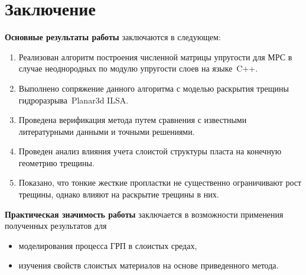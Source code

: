 \chapter*{Заключение}                       %
\label{sec:conclusion} 

\textbf{Основные результаты работы} заключаются в следующем:
\begin{enumerate}
    \item Реализован алгоритм построения численной матрицы упругости для МРС в случае неоднородных по модулю упругости слоев на языке~C++.
    \item Выполнено сопряжение данного алгоритма с моделью раскрытия трещины гидроразрыва Planar3d ILSA.
    \item Проведена верификация метода путем сравнения с известными литературными данными и точными решениями.
    \item Проведен анализ влияния учета слоистой структуры пласта на конечную геометрию трещины.
    \item Показано, что тонкие жесткие пропластки не существенно ограничивают рост трещины, однако влияют на раскрытие трещины в них.
\end{enumerate}

\textbf{Практическая значимость работы} заключается в возможности применения полученных результатов для
\begin{itemize}
    \item моделирования процесса ГРП в слоистых средах,
    \item изучения свойств слоистых материалов на основе приведенного метода.
\end{itemize}
